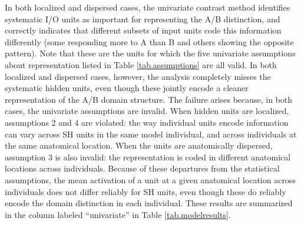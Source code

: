 In both localized and dispersed cases, the univariate contrast method identifies systematic I/O units as important for representing the A/B distinction, and correctly indicates that different subsets of input units code this information differently (some responding more to A than B and others showing the opposite pattern). Note that these are the units for which the five univariate assumptions about representation listed in Table \ref{tab.assumptions} are all valid. In both localized and dispersed cases, however, the analysis completely misses the systematic hidden units, even though these jointly encode a cleaner representation of the A/B domain structure. The failure arises because, in both cases, the univariate assumptions are invalid. When hidden units are localized, assumptions 2 and 4 are violated: the way individual units encode information can vary across SH units in the same model individual, and across individuals at the same anatomical location. When the units are anatomically dispersed, assumption 3 is also invalid: the representation is coded in different anatomical locations across individuals. Because of these departures from the statistical assumptions, the mean activation of a unit at a given anatomical location across individuals does not differ reliably for SH units, even though these do reliably encode the domain distinction in each individual. These results are summarized in the column labeled ``univariate'' in Table \ref{tab.modelresults}.

